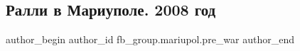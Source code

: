  
 
 
 
 

\subsection{Ралли в Мариуполе. 2008 год}
\label{sec:16_02_2023.fb.fb_group.mariupol.pre_war.5.ralli_v_mariupole__2}

\ifcmt
 author_begin
   author_id fb_group.mariupol.pre_war
 author_end
\fi
